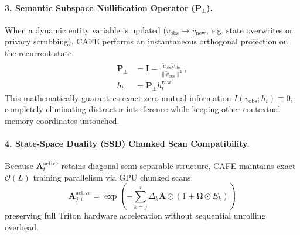 \paragraph{3. Semantic Subspace Nullification Operator ($\mathbf{P}_{\perp}$).}
When a dynamic entity variable is updated ($v_{\mathrm{obs}} \rightarrow v_{\mathrm{new}}$, e.g. state overwrites or privacy scrubbing), CAFE performs an instantaneous orthogonal projection on the recurrent state:
\begin{equation}
\begin{split}
    \mathbf{P}_{\perp} &= \mathbf{I} - \frac{\tilde{v}_{\mathrm{obs}} \tilde{v}_{\mathrm{obs}}^\top}{\|\tilde{v}_{\mathrm{obs}}\|^2}, \\
    h_t &= \mathbf{P}_{\perp} h_t^{\mathrm{raw}}

\end{split}
\end{equation}
This mathematically guarantees exact zero mutual information $I(v_{\mathrm{obs}}; h_t) \equiv 0$, completely eliminating distractor interference while keeping other contextual memory coordinates untouched.

\paragraph{4. State-Space Duality (SSD) Chunked Scan Compatibility.}
Because $\mathbf{A}_t^{\mathrm{active}}$ retains diagonal semi-separable structure, CAFE maintains exact $\mathcal{O}(L)$ training parallelism via GPU chunked scans:
\begin{equation}
    \mathbf{A}_{j:i}^{\mathrm{active}} = \exp\left( -\sum_{k=j}^i \Delta_k \mathbf{A} \odot (1 + \boldsymbol{\Omega} \odot E_k) \right)
\end{equation}
preserving full Triton hardware acceleration without sequential unrolling overhead.
